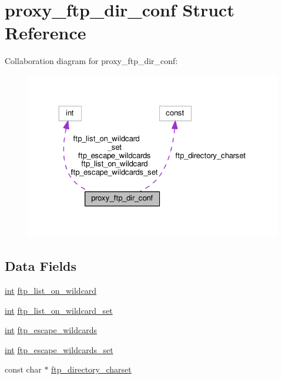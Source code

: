 \hypertarget{structproxy__ftp__dir__conf}{}\section{proxy\+\_\+ftp\+\_\+dir\+\_\+conf Struct Reference}
\label{structproxy__ftp__dir__conf}


Collaboration diagram for proxy\+\_\+ftp\+\_\+dir\+\_\+conf\+:
\nopagebreak
\begin{figure}[H]
\begin{center}
\leavevmode
\includegraphics[width=324pt]{structproxy__ftp__dir__conf__coll__graph}
\end{center}
\end{figure}
\subsection*{Data Fields}
\begin{DoxyCompactItemize}
\item 
\hyperlink{pcre_8txt_a42dfa4ff673c82d8efe7144098fbc198}{int} \hyperlink{structproxy__ftp__dir__conf_a3ac690a3d21c2489a29a8959ccdd2242}{ftp\+\_\+list\+\_\+on\+\_\+wildcard}
\item 
\hyperlink{pcre_8txt_a42dfa4ff673c82d8efe7144098fbc198}{int} \hyperlink{structproxy__ftp__dir__conf_aa9c49dcc30a8352f840821a8bcec2b3e}{ftp\+\_\+list\+\_\+on\+\_\+wildcard\+\_\+set}
\item 
\hyperlink{pcre_8txt_a42dfa4ff673c82d8efe7144098fbc198}{int} \hyperlink{structproxy__ftp__dir__conf_ace3d2ea457d77d0160cd0edb7208431f}{ftp\+\_\+escape\+\_\+wildcards}
\item 
\hyperlink{pcre_8txt_a42dfa4ff673c82d8efe7144098fbc198}{int} \hyperlink{structproxy__ftp__dir__conf_a2e7d15b10ffe24afc4da144587625319}{ftp\+\_\+escape\+\_\+wildcards\+\_\+set}
\item 
const char $\ast$ \hyperlink{structproxy__ftp__dir__conf_ab846e63461c1756129b9f48d1b19d6bd}{ftp\+\_\+directory\+\_\+charset}
\end{DoxyCompactItemize}


